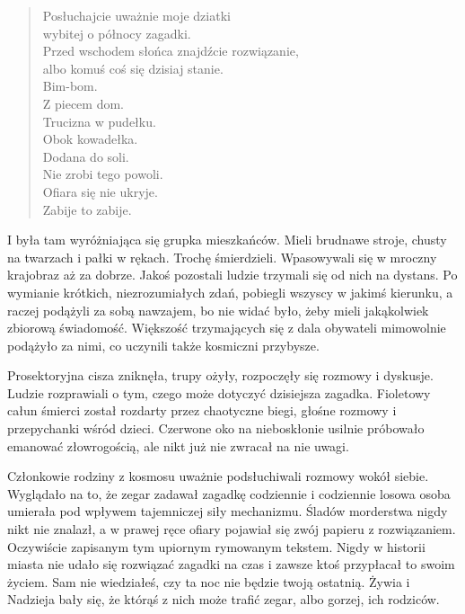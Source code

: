 \begin{sl}
\begin{quote}
Posłuchajcie uważnie moje dziatki \\
wybitej o północy zagadki. \\
Przed wschodem słońca znajdźcie rozwiązanie, \\
albo komuś coś się dzisiaj stanie. \\
Bim-bom. \\
Z piecem dom. \\
Trucizna w pudełku. \\
Obok kowadełka. \\
Dodana do soli. \\
Nie zrobi tego powoli. \\
Ofiara się nie ukryje. \\
Zabije to zabije. \\
\end{quote}
\end{sl}

I była tam wyróżniająca się grupka mieszkańców.
Mieli brudnawe stroje, chusty na twarzach i pałki w rękach. Trochę śmierdzieli.
Wpasowywali się w mroczny krajobraz aż za dobrze.
Jakoś pozostali ludzie trzymali się od nich na dystans.
Po wymianie krótkich, niezrozumiałych zdań, pobiegli wszyscy w jakimś kierunku, a raczej podążyli za sobą nawzajem, bo nie widać było, żeby mieli jakąkolwiek zbiorową świadomość.
Większość trzymających się z dala obywateli mimowolnie podążyło za nimi, co uczynili także kosmiczni przybysze.

Prosektoryjna cisza zniknęła, trupy ożyły, rozpoczęły się rozmowy i dyskusje.
Ludzie rozprawiali o tym, czego może dotyczyć dzisiejsza zagadka.
Fioletowy całun śmierci został rozdarty przez chaotyczne biegi, głośne rozmowy i przepychanki wśród dzieci.
Czerwone oko na nieboskłonie usilnie próbowało emanować złowrogością, ale nikt już nie zwracał na nie uwagi.

Członkowie rodziny z kosmosu uważnie podsłuchiwali rozmowy wokół siebie.
Wyglądało na to, że zegar zadawał zagadkę codziennie i codziennie losowa osoba umierała pod wpływem tajemniczej siły mechanizmu.
Śladów morderstwa nigdy nikt nie znalazł, a w prawej ręce ofiary pojawiał się zwój papieru z rozwiązaniem.
Oczywiście zapisanym tym upiornym rymowanym tekstem.
Nigdy w historii miasta nie udało się rozwiązać zagadki na czas i zawsze ktoś przypłacał to swoim życiem.
Sam nie wiedziałeś, czy ta noc nie będzie twoją ostatnią. 
Żywia i Nadzieja bały się, że którąś z nich może trafić zegar, albo gorzej, ich rodziców.


